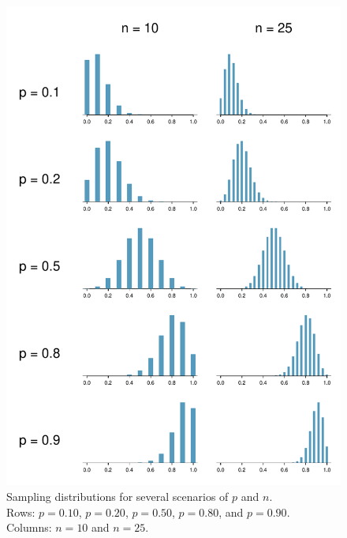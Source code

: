 \begin{figure}
   \centering
   \includegraphics[width=\textwidth]{ch_foundations_for_inf/figures/clt_prop_grid/clt_prop_grid_1}
   \caption{Sampling distributions for several scenarios
       of $p$ and $n$. \\
       Rows: $p = 0.10$, $p = 0.20$, $p = 0.50$,
       $p = 0.80$, and $p = 0.90$. \\
       Columns: $n = 10$ and $n = 25$.}
   \label{clt_prop_grid_1}
\end{figure}

